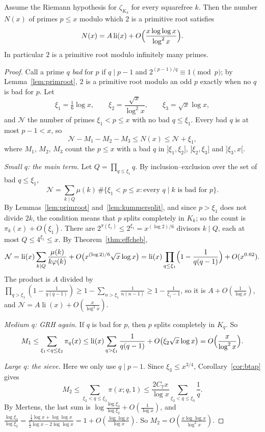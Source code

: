 \begin{theorem}[Hooley, 1967]\label{thm:hooley}
Assume the Riemann hypothesis for $\zeta_{K_k}$ for every squarefree $k$. Then the number $N(x)$ of primes $p\le x$ modulo which $2$ is a primitive root satisfies
\[
N(x)=A\operatorname{li}(x)+O\Bigl(\frac{x\log\log x}{\log^2x}\Bigr).
\]
In particular $2$ is a primitive root modulo infinitely many primes.
\end{theorem}
\begin{proof}
Call a prime $q$ \emph{bad} for $p$ if $q\mid p-1$ and $2^{(p-1)/q}\equiv1\pmod p$; by Lemma~\ref{lem:primroot}, $2$ is a primitive root modulo an odd $p$ exactly when no $q$ is bad for $p$. Let
\[
\xi_1=\tfrac16\log x,\qquad\xi_2=\frac{\sqrt x}{\log^2x},\qquad\xi_3=\sqrt x\log x,
\]
and $\mathcal N$ the number of primes $\xi_1<p\le x$ with no bad $q\le\xi_1$. Every bad $q$ is at most $p-1<x$, so
\[
\mathcal N-M_1-M_2-M_3\le N(x)\le\mathcal N+\xi_1,
\]
where $M_1$, $M_2$, $M_3$ count the $p\le x$ with a bad $q$ in $]\xi_1,\xi_2]$, $]\xi_2,\xi_3]$ and $]\xi_3,x[$.

\emph{Small $q$: the main term.} Let $Q=\prod_{q\le\xi_1}q$. By inclusion--exclusion over the set of bad $q\le\xi_1$,
\[
\mathcal N=\sum_{k\mid Q}\mu(k)\,\#\{\xi_1<p\le x:\text{every }q\mid k\text{ is bad for }p\}.
\]
By Lemmas~\ref{lem:primroot} and~\ref{lem:kummersplit}, and since $p>\xi_1$ does not divide $2k$, the condition means that $p$ splits completely in $K_k$; so the count is $\pi_k(x)+O(\xi_1)$. There are $2^{\pi(\xi_1)}\le2^{\xi_1}=x^{(\log2)/6}$ divisors $k\mid Q$, each at most $Q\le4^{\xi_1}\le x$. By Theorem~\ref{thm:effcheb},
\[
\mathcal N=\operatorname{li}(x)\sum_{k\mid Q}\frac{\mu(k)}{k\varphi(k)}+O\bigl(x^{(\log2)/6}\sqrt x\log x\bigr)=\operatorname{li}(x)\prod_{q\le\xi_1}\Bigl(1-\frac1{q(q-1)}\Bigr)+O(x^{0.62}).
\]
The product is $A$ divided by $\prod_{q>\xi_1}(1-\frac1{q(q-1)})\ge1-\sum_{n>\xi_1}\frac1{n(n-1)}\ge1-\frac1{\xi_1-1}$, so it is $A+O(\frac1{\log x})$, and $\mathcal N=A\operatorname{li}(x)+O(\frac x{\log^2x})$.

\emph{Medium $q$: GRH again.} If $q$ is bad for $p$, then $p$ splits completely in $K_q$. So
\[
M_1\le\sum_{\xi_1<q\le\xi_2}\pi_q(x)\le\operatorname{li}(x)\sum_{q>\xi_1}\frac1{q(q-1)}+O\bigl(\xi_2\sqrt x\log x\bigr)=O\Bigl(\frac x{\log^2x}\Bigr).
\]

\emph{Large $q$: the sieve.} Here we only use $q\mid p-1$. Since $\xi_3\le x^{3/4}$, Corollary~\ref{cor:btap} gives
\[
M_2\le\sum_{\xi_2<q\le\xi_3}\pi(x;q,1)\le\frac{2C_7x}{\log x}\sum_{\xi_2<q\le\xi_3}\frac1q.
\]
By Mertens, the last sum is $\log\frac{\log\xi_3}{\log\xi_2}+O(\frac1{\log x})$, and $\frac{\log\xi_3}{\log\xi_2}=\frac{\frac12\log x+\log\log x}{\frac12\log x-2\log\log x}=1+O(\frac{\log\log x}{\log x})$. So $M_2=O(\frac{x\log\log x}{\log^2x})$.


\end{proof}
